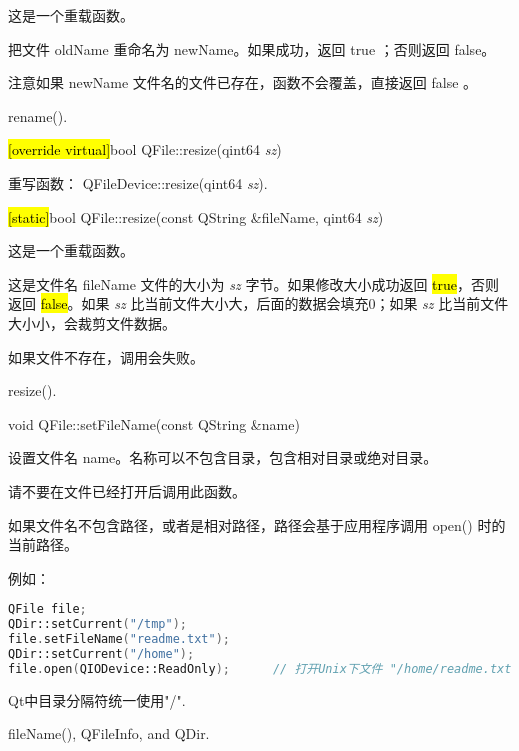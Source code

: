 这是一个重载函数。

把文件 oldName 重命名为 newName。如果成功，返回 true ；否则返回 false。

注意如果 newName 文件名的文件已存在，函数不会覆盖，直接返回 false 。


\begin{notice}[另请参阅]
rename().
\end{notice}

\hl{[override virtual]}bool QFile::resize(qint64 \emph{sz})

重写函数： QFileDevice::resize(qint64 \emph{sz}).

\hl{[static]}bool QFile::resize(const QString \&fileName, qint64 \emph{sz})

这是一个重载函数。

这是文件名 fileName 文件的大小为 \emph{sz} 字节。如果修改大小成功返回 \hl{true}，否则返回 \hl{false}。如果 \emph{sz} 比当前文件大小大，后面的数据会填充0；如果 \emph{sz} 比当前文件大小小，会裁剪文件数据。



\begin{notice}[警告]
如果文件不存在，调用会失败。
\end{notice}

\begin{notice}[另请参阅]
resize().
\end{notice}

void QFile::setFileName(const QString \&name)

设置文件名 name。名称可以不包含目录，包含相对目录或绝对目录。

请不要在文件已经打开后调用此函数。

如果文件名不包含路径，或者是相对路径，路径会基于应用程序调用 open() 时的当前路径。

例如：

\begin{lstlisting}[language=C++]
QFile file;
QDir::setCurrent("/tmp");
file.setFileName("readme.txt");
QDir::setCurrent("/home");
file.open(QIODevice::ReadOnly);      // 打开Unix下文件 "/home/readme.txt"
\end{lstlisting}



\begin{notice}
Qt中目录分隔符统一使用"/".
\end{notice}

\begin{notice}[另请参阅]
fileName(), QFileInfo, and QDir.
\end{notice}


